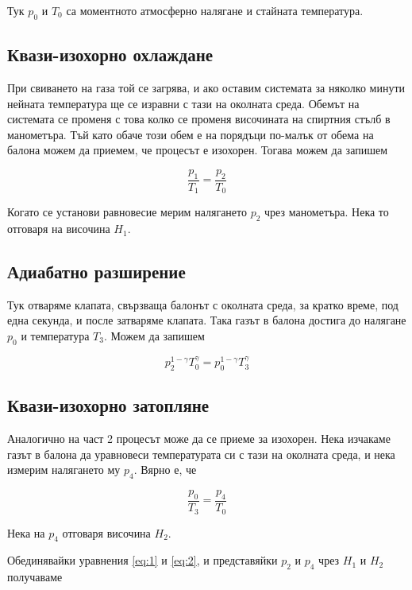 \documentclass[%
 reprint,
 amsmath,amssymb,
 aps,
]{revtex4-2}
\begin{document}
Тук $p_0$ и $T_0$ са моментното атмосферно налягане и стайната температура.

\subsection{Квази-изохорно охлаждане}
При свиването на газа той се загрява, и ако оставим системата за няколко минути нейната температура ще се изравни с тази на околната среда. Обемът на системата се променя с това колко се променя височината на спиртния стълб в манометъра. Тъй като обаче този обем е на порядъци по-малък от обема на балона можем да приемем, че процесът е изохорен. Тогава можем да запишем

\begin{equation*}
    \frac{p_1}{T_1} = \frac{p_2}{T_0}
\end{equation*}

Когато се установи равновесие мерим налягането $p_2$ чрез манометъра. Нека то отговаря на височина $H_1$. 

\subsection{Адиабатно разширение}
Тук отваряме клапата, свързваща балонът с околната среда, за кратко време, под една секунда, и после затваряме клапата. Така газът в балона достига до налягане $p_0$ и температура $T_3$. Можем да запишем

\begin{equation*}
    p_2^{1-\gamma} T_0^{\gamma} = p_0^{1 - \gamma} T_3^{\gamma} \label{eq:1} \tag{1}
\end{equation*}

\subsection{Квази-изохорно затопляне}
Аналогично на част 2 процесът може да се приеме за изохорен. Нека изчакаме газът в балона да уравновеси температурата си с тази на околната среда, и нека измерим налягането му $p_4$. Вярно е, че

\begin{equation*}
    \frac{p_0}{T_3} = \frac{p_4}{T_0} \label{eq:2} \tag{2}
\end{equation*}

Нека на $p_4$ отговаря височина $H_2$. 

Обединявайки уравнения \eqref{eq:1} и \eqref{eq:2}, и представяйки $p_2$ и $p_4$ чрез $H_1$ и $H_2$ получаваме
\end{document}
